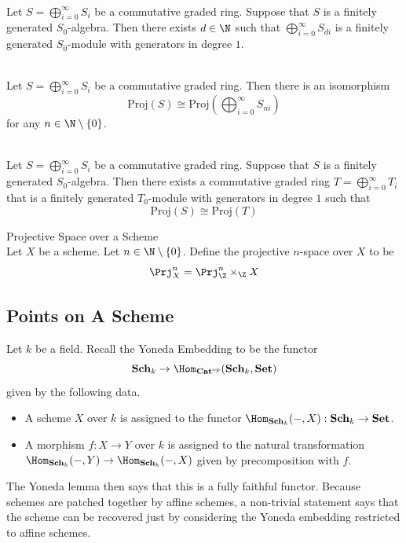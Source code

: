 \documentclass[a4paper]{article}
\begin{document}
\begin{prp}{}{}\\
Let $S=\bigoplus_{i=0}^\infty S_i$ be a commutative graded ring. Suppose that $S$ is a finitely generated $S_0$-algebra. Then there exists $d\in\N$ such that $\bigoplus_{i=0}^\infty S_{di}$ is a finitely generated $S_0$-module with generators in degree $1$. 
\end{prp}

\begin{prp}{}{}\\
Let $S=\bigoplus_{i=0}^\infty S_i$ be a commutative graded ring. Then there is an isomorphism $$\text{Proj}(S)\cong\text{Proj}\left(\bigoplus_{i=0}^\infty S_{ni}\right)$$ for any $n\in\N\setminus\{0\}$. 
\end{prp}

\begin{crl}{}{}\\
Let $S=\bigoplus_{i=0}^\infty S_i$ be a commutative graded ring. Suppose that $S$ is a finitely generated $S_0$-algebra. Then there exists a commutative graded ring $T=\bigoplus_{i=0}^\infty T_i$ that is a finitely generated $T_0$-module with generators in degree $1$ such that $$\text{Proj}(S)\cong\text{Proj}(T)$$
\end{crl}

\begin{defn}{Projective Space over a Scheme}{}\\
Let $X$ be a scheme. Let $n\in\N\setminus\{0\}$. Define the projective $n$-space over $X$ to be $$\Prj_X^n=\Prj_\Z^n\times_\Z X$$
\end{defn}

\subsection{Points on A Scheme}
Let $k$ be a field. Recall the Yoneda Embedding to be the functor $$\bold{Sch}_k\to\Hom_{\bold{Cat}^{\text{op}}}(\bold{Sch}_k,\bold{Set})$$ given by the following data. 
\begin{itemize}
\item A scheme $X$ over $k$ is assigned to the functor $\Hom_{\bold{Sch}_k}(-,X):\bold{Sch}_k\to\bold{Set}$. 
\item A morphism $f:X\to Y$ over $k$ is assigned to the natural transformation $\Hom_{\bold{Sch}_k}(-,Y)\to\Hom_{\bold{Sch}_k}(-,X)$ given by precomposition with $f$. 
\end{itemize}

The Yoneda lemma then says that this is a fully faithful functor. Because schemes are patched together by affine schemes, a non-trivial statement says that the scheme can be recovered just by considering the Yoneda embedding restricted to affine schemes. 
\end{document}
